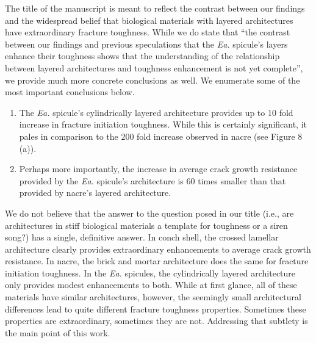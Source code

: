 \documentclass[11pt,letterpaper]{report}
\makeatletter
\newcommand{\EA}{\textit{Ea.\@}\xspace}
\makeatother
\begin{document}
The title of the manuscript is meant to reflect the contrast between our findings and the widespread belief that biological materials with layered architectures have extraordinary fracture toughness. While we do state that ``the contrast between our findings and previous speculations that the \EA spicule's layers enhance their toughness shows that the understanding of the relationship between layered architectures and toughness enhancement is not yet complete'', we provide much more concrete conclusions as well. We enumerate some of the most important conclusions below.
%
\begin{enumerate}
    \item The \EA spicule's cylindrically layered architecture provides up to 10 fold increase in fracture initiation toughness. While this is certainly significant, it pales in comparison to the 200 fold increase observed in nacre (see Figure 8 (a)).
    \item Perhaps more importantly, the increase in average crack growth resistance provided by the \EA spicule's architecture is 60 times smaller than that provided by nacre's layered architecture.
\end{enumerate}
%
We do not believe that the answer to the question posed in our title (i.e., are architectures in stiff biological materials a template for toughness or a siren song?) has a single, definitive answer. In conch shell, the crossed lamellar architecture clearly provides extraordinary enhancements to average crack growth resistance. In nacre, the brick and mortar architecture does the same for fracture initiation toughness. In the \EA spicules, the cylindrically layered architecture only provides modest enhancements to both. While at first glance, all of these materials have similar architectures, however, the seemingly small architectural differences lead to quite different fracture toughness properties. Sometimes these properties are extraordinary, sometimes they are not. Addressing that subtlety is the main point of this work.

\clearpage


\end{document}
